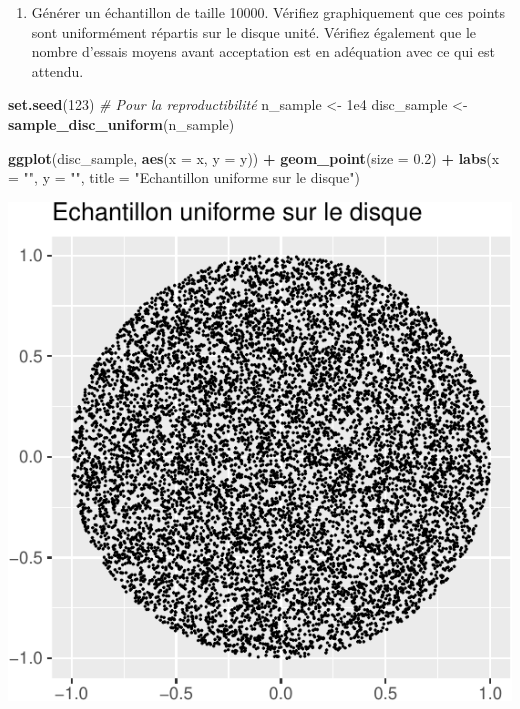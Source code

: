 \documentclass[]{article}
\newenvironment{Shaded}{\begin{snugshade}}{\end{snugshade}}
\newcommand{\CommentTok}[1]{\textcolor[rgb]{0.56,0.35,0.01}{\textit{#1}}}
\newcommand{\DataTypeTok}[1]{\textcolor[rgb]{0.13,0.29,0.53}{#1}}
\newcommand{\DecValTok}[1]{\textcolor[rgb]{0.00,0.00,0.81}{#1}}
\newcommand{\FloatTok}[1]{\textcolor[rgb]{0.00,0.00,0.81}{#1}}
\newcommand{\KeywordTok}[1]{\textcolor[rgb]{0.13,0.29,0.53}{\textbf{#1}}}
\newcommand{\NormalTok}[1]{#1}
\newcommand{\OperatorTok}[1]{\textcolor[rgb]{0.81,0.36,0.00}{\textbf{#1}}}
\newcommand{\StringTok}[1]{\textcolor[rgb]{0.31,0.60,0.02}{#1}}
\providecommand{\tightlist}{%
  \setlength{\itemsep}{0pt}\setlength{\parskip}{0pt}}
\begin{document}
\begin{enumerate}
\def\labelenumi{\arabic{enumi}.}
\setcounter{enumi}{4}
\tightlist
\item
  Générer un échantillon de taille 10000. Vérifiez graphiquement que ces
  points sont uniformément répartis sur le disque unité. Vérifiez
  également que le nombre d'essais moyens avant acceptation est en
  adéquation avec ce qui est attendu.
\end{enumerate}

\begin{Shaded}
\begin{Highlighting}[]
\KeywordTok{set.seed}\NormalTok{(}\DecValTok{123}\NormalTok{) }\CommentTok{# Pour la reproductibilité}
\NormalTok{n_sample <-}\StringTok{ }\FloatTok{1e4}
\NormalTok{disc_sample <-}\StringTok{ }\KeywordTok{sample_disc_uniform}\NormalTok{(n_sample)}
\end{Highlighting}
\end{Shaded}

\begin{Shaded}
\begin{Highlighting}[]
\KeywordTok{ggplot}\NormalTok{(disc_sample, }\KeywordTok{aes}\NormalTok{(}\DataTypeTok{x =}\NormalTok{ x, }\DataTypeTok{y =}\NormalTok{ y)) }\OperatorTok{+}
\StringTok{  }\KeywordTok{geom_point}\NormalTok{(}\DataTypeTok{size =} \FloatTok{0.2}\NormalTok{) }\OperatorTok{+}
\StringTok{  }\KeywordTok{labs}\NormalTok{(}\DataTypeTok{x =} \StringTok{""}\NormalTok{, }\DataTypeTok{y =} \StringTok{""}\NormalTok{, }\DataTypeTok{title =} \StringTok{"Echantillon uniforme sur le disque"}\NormalTok{)}
\end{Highlighting}
\end{Shaded}

\begin{center}\includegraphics{correction_simulation_variables_aleatoires_files/figure-latex/plot_disque-1} \end{center}
\end{document}
